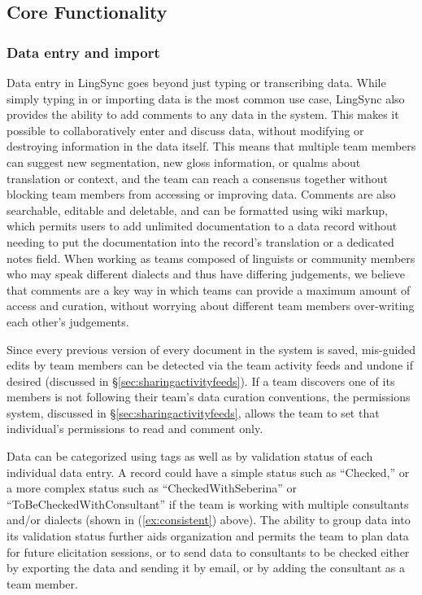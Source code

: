 \documentclass[letterpaper, 12pt, dvips]{mitwpl}
\begin{document}
\subsection{Core Functionality}
\label{sec:core}
\subsubsection{Data entry and import}


Data entry in LingSync goes beyond just typing or transcribing data.
While simply typing in or importing data is the most common use case,
LingSync also provides the ability to add comments to any data in the system.
This makes it possible to collaboratively enter and discuss data,
without modifying or destroying information in the data itself.
This means that multiple team members can suggest new segmentation,
new gloss information,
or qualms about translation or context,
and the team can reach a consensus together without blocking team members from accessing or improving data.
Comments are also searchable, editable and deletable,
and can be formatted using wiki markup, which permits users to add unlimited documentation to a data record without needing to put the documentation into the record's  translation or a dedicated notes field.
When working as teams composed of linguists or community members who may speak different dialects
and thus have differing judgements,
we believe that comments are a key way in which teams can provide a maximum amount of access and curation,
without worrying about different team members over-writing each other's judgements.


Since every previous version of every document in the system is saved,
mis-guided edits by team members can be detected  via the team activity feeds and undone if desired (discussed in \S \ref{sec:sharingactivityfeeds}).
If a team discovers one of its members is not following their team's data curation conventions,
the permissions system, discussed in \S \ref{sec:sharingactivityfeeds}, allows the team to set that individual's permissions to read and comment only.
 

Data can be categorized using tags as well as by validation status of each individual data entry.
A record could have a simple status such as ``Checked,'' or a more complex status such as  ``CheckedWithSeberina'' or ``ToBeCheckedWithConsultant'' if the team is working with multiple consultants and/or dialects (shown in (\ref{ex:consistent}) above).
The ability to group data into its validation status further aids organization and permits the team to plan data for future elicitation sessions,
or to send data to consultants to be checked either by exporting the data and sending it by email,
or by adding the consultant as a team member. 
\end{document}
